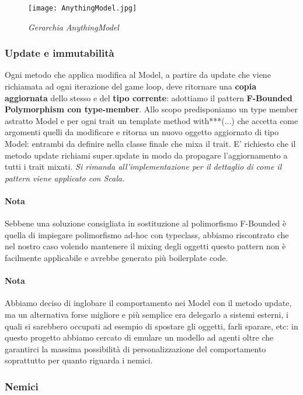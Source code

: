 \begin{figure}[!hbt]
    \centering
    \texttt{[image: AnythingModel.jpg]}
    \caption{\textit{Gerarchia AnythingModel}} 
\end{figure}

\subsubsection{Update e immutabilità}

Ogni metodo che applica modifica al Model, a partire da update che viene richiamata ad ogni iterazione del game loop, deve ritornare una \textbf{copia aggiornata} dello stesso e del \textbf{tipo corrente}: adottiamo il pattern \textbf{F-Bounded Polymorphism con type-member}. 
Allo scopo predisponiamo un type member astratto Model e per ogni trait un template method with***(...) che accetta come argomenti quelli da modificare e ritorna un nuovo oggetto aggiornato di tipo Model: entrambi da definire nella classe finale che mixa il trait.
E' richiesto che il metodo update richiami super.update in modo da propagare l'aggiornamento a tutti i trait mixati.
\textit{Si rimanda all'implementazione per il dettaglio di come il pattern viene applicato con Scala.}

\paragraph{Nota} Sebbene una soluzione consigliata in sostituzione al polimorfismo F-Bounded è quella di impiegare polimorfismo ad-hoc con typeclass, abbiamo riscontrato che nel nostro caso volendo mantenere il mixing degli oggetti questo pattern non è facilmente applicabile e avrebbe generato più boilerplate code.

\paragraph{Nota}
Abbiamo deciso di inglobare il comportamento nei Model con il metodo update, ma un alternativa forse migliore e più semplice era delegarlo a sistemi esterni, i quali si sarebbero occupati ad esempio di spostare gli oggetti, farli sparare, etc: in questo progetto abbiamo cercato di emulare un modello ad agenti oltre che garantirci la massima possibilità di personalizzazione del comportamento soprattutto per quanto riguarda i nemici. 

\subsubsection{Nemici}

